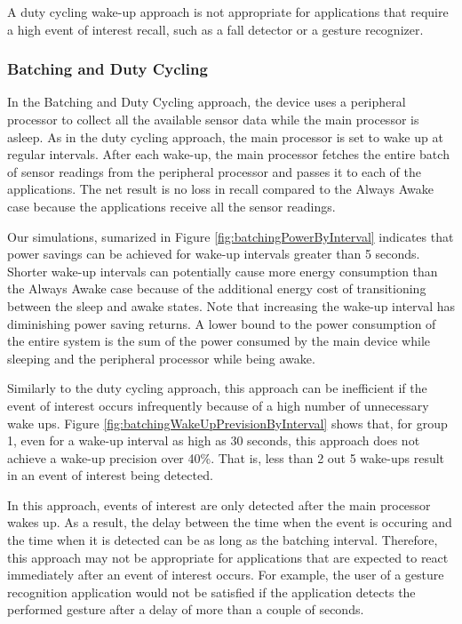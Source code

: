 A duty cycling wake-up approach is not appropriate for applications that require a high event of interest recall, such as a fall detector or a gesture recognizer.

\subsubsection{Batching and Duty Cycling}

In the Batching and Duty Cycling approach, the device uses a peripheral processor to collect all the available sensor data while the main processor is asleep. As in the duty cycling approach, the main processor is set to wake up at regular intervals. After each wake-up, the main processor fetches the entire batch of sensor readings from the peripheral processor and passes it to each of the applications. The net result is no loss in recall compared to the Always Awake case because the applications receive all the sensor readings. 

Our simulations, sumarized in Figure \ref{fig:batchingPowerByInterval} indicates that power savings can be achieved for wake-up intervals greater than 5 seconds. Shorter wake-up intervals can potentially cause more energy consumption than the Always Awake case because of the additional energy cost of transitioning between the sleep and awake states. Note that increasing the wake-up interval has diminishing power saving returns. A lower bound to the power consumption of the entire system is the sum of the power consumed by the main device while sleeping and the peripheral processor while being awake.

Similarly to the duty cycling approach, this approach can be inefficient if the event of interest occurs infrequently because of a high number of unnecessary wake ups. Figure \ref{fig:batchingWakeUpPrevisionByInterval} shows that, for group 1, even for a wake-up interval as high as 30 seconds, this approach does not achieve a wake-up precision over 40\%. That is, less than 2 out 5 wake-ups result in an event of interest being detected.

In this approach, events of interest are only detected after the main processor wakes up. As a result, the delay between the time when the event is occuring and the time when it is detected can be as long as the batching interval. Therefore, this approach may not be appropriate for applications that are expected to react immediately after an event of interest occurs. For example, the user of a gesture recognition application would not be satisfied if the application detects the performed gesture after a delay of more than a couple of seconds.


